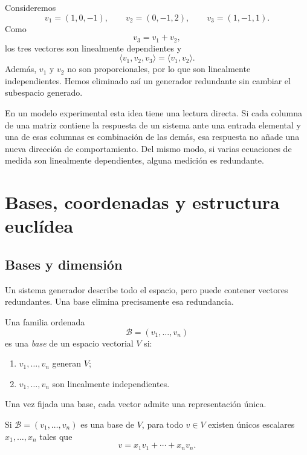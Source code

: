 \begin{example}
Consideremos
\[
v_1=(1,0,-1),\qquad
v_2=(0,-1,2),\qquad
v_3=(1,-1,1).
\]
Como
\[
v_3=v_1+v_2,
\]
los tres vectores son linealmente dependientes y
\[
\langle v_1,v_2,v_3\rangle
=
\langle v_1,v_2\rangle.
\]
Además, $v_1$ y $v_2$ no son proporcionales, por lo que son linealmente independientes. Hemos eliminado así un generador redundante sin cambiar el subespacio generado.
\end{example}

En un modelo experimental esta idea tiene una lectura directa. Si cada columna de una matriz contiene la respuesta de un sistema ante una entrada elemental y una de esas columnas es combinación de las demás, esa respuesta no añade una nueva dirección de comportamiento. Del mismo modo, si varias ecuaciones de medida son linealmente dependientes, alguna medición es redundante.

\section{Bases, coordenadas y estructura euclídea}
\label{sec:bases-euclidea}

\subsection{Bases y dimensión}

Un sistema generador describe todo el espacio, pero puede contener vectores redundantes. Una base elimina precisamente esa redundancia.

\begin{definition}[Base]
Una familia ordenada
\[
\mathcal B=(v_1,\ldots,v_n)
\]
es una \emph{base} de un espacio vectorial $V$ si:
\begin{enumerate}
\item $v_1,\ldots,v_n$ generan $V$;
\item $v_1,\ldots,v_n$ son linealmente independientes.
\end{enumerate}
\end{definition}

Una vez fijada una base, cada vector admite una representación única.

\begin{theorem}
Si $\mathcal B=(v_1,\ldots,v_n)$ es una base de $V$, para todo $v\in V$ existen únicos escalares $x_1,\ldots,x_n$ tales que
\[
v=x_1v_1+\cdots+x_nv_n.
\]
\end{theorem}

